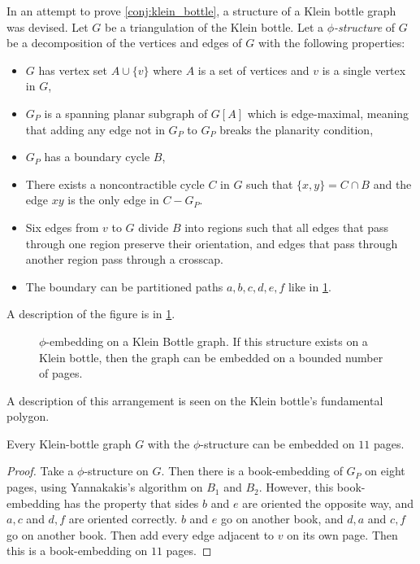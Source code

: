 In an attempt to prove \cref{conj:klein_bottle}, a structure of a Klein bottle graph was devised. Let $G$ be a triangulation of the Klein bottle. Let a \textit{$\phi$-structure} of $G$ be a decomposition of the vertices and edges of $G$ with the following properties:
\begin{itemize}
    \item $G$ has vertex set $A \cup \{v\}$ where $A$ is a set of vertices and $v$ is a single vertex in $G$,
    \item $G_P$ is a spanning planar subgraph of $G[A]$ which is edge-maximal, meaning that adding any edge not in $G_P$ to $G_P$ breaks the planarity condition,
    \item $G_P$ has a boundary cycle $B$,
    \item There exists a noncontractible cycle $C$ in $G$ such that $\{x, y\} = C \cap B$ and the edge $xy$ is the only edge in $C - G_P$. 
    \item Six edges from $v$ to $G$ divide $B$ into regions such that all edges that pass through one region preserve their orientation, and edges that pass through another region pass through a crosscap. 
    \item The boundary can be partitioned paths $a, b, c, d, e, f$ like in \cref{fig:phiembedding}. 
\end{itemize}

A description of the figure is in \cref{fig:phiembedding}.

\begin{figure}[h]
    \centering
    
    \caption[$\phi$-embedding of a Klein bottle graph.]{$\phi$-embedding on a Klein Bottle graph. If this structure exists on a Klein bottle, then the graph can be embedded on a bounded number of pages. }\label{fig:phiembedding}
\end{figure}

A description of this arrangement is seen on the Klein bottle's fundamental polygon. 
\begin{claim}
    Every Klein-bottle graph $G$ with the $\phi$-structure can be embedded on $11$ pages. 
\end{claim}
\begin{proof}
    Take a $\phi$-structure on $G$. Then there is a book-embedding of $G_P$ on eight pages, using Yannakakis's algorithm on $B_1$ and $B_2$. However, this book-embedding has the property that sides $b$ and $e$ are oriented the opposite way, and $a, c$ and $d, f$ are oriented correctly. $b$ and $e$ go on another book, and $d, a$ and $c, f$ go on another book. Then add every edge adjacent to $v$ on its own page. Then this is a book-embedding on $11$ pages. 
\end{proof}

